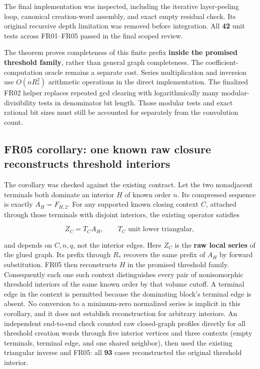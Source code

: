 \documentclass[
  11pt,
  a4paper,
]{report}
\let\singularitytexttt\texttt
\renewcommand{\texttt}[1]{\singularitytexttt{\seqsplit{#1}}}
\begin{document}
The final implementation was inspected, including the iterative
layer-peeling loop, canonical creation-word assembly, and exact empty
residual check. Its original recursive depth limitation was removed
before integration. All \textbf{42} unit tests across FR01--FR05 passed
in the final scoped review.

The theorem proves completeness of this finite prefix \textbf{inside the
promised threshold family}, rather than general graph completeness. The
coefficient-computation oracle remains a separate cost. Series
multiplication and inversion use \(O(nR_*^2)\) arithmetic operations in
the direct implementation. The finalized FR02 helper replaces repeated
gcd clearing with logarithmically many modular-divisibility tests in
denominator bit length. Those modular tests and exact rational bit sizes
must still be accounted for separately from the convolution count.

\hypertarget{fr05-corollary-one-known-raw-closure-reconstructs-threshold-interiors}{%
\subsection{FR05 corollary: one known raw closure reconstructs threshold
interiors}\label{fr05-corollary-one-known-raw-closure-reconstructs-threshold-interiors}}

The corollary was checked against the existing \texttt{charges.py}
contract. Let the two nonadjacent terminals both dominate an interior
\(H\) of known order \(n\). Its compressed sequence is exactly
\(A_H=F_{H,2}\). For any supported known closing context \(C\), attached
through those terminals with disjoint interiors, the existing operator
satisfies

\[
 Z_C=T_C A_H,\qquad T_C\text{ unit lower triangular},
\]

and depends on \(C,n,q\), not the interior edges. Here \(Z_C\) is the
\textbf{raw local series} of the glued graph. Its prefix through \(R_*\)
recovers the same prefix of \(A_H\) by forward substitution. FR05 then
reconstructs \(H\) in the promised threshold family. Consequently each
one such context distinguishes every pair of nonisomorphic threshold
interiors of the same known order by that volume cutoff. A terminal edge
in the context is permitted because the dominating block's terminal edge
is absent. No conversion to a minimum-zero normalized series is implicit
in this corollary, and it does not establish reconstruction for
arbitrary interiors. An independent end-to-end check counted raw
closed-graph profiles directly for all threshold creation words through
five interior vertices and three contexts (empty terminals, terminal
edge, and one shared neighbor), then used the existing triangular
inverse and FR05: all \textbf{93} cases reconstructed the original
threshold interior.
\end{document}
